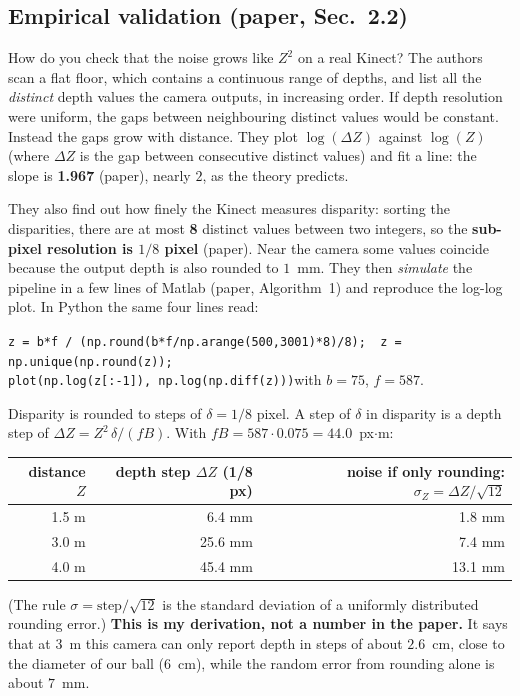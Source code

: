 \documentclass[11pt,a4paper]{article}
\begin{document}
\subsection{Empirical validation (paper, Sec.~2.2)}
\label{sec:quant}
How do you check that the noise grows like $Z^2$ on a real Kinect? The authors scan a flat floor,
which contains a continuous range of depths, and list all the \emph{distinct} depth values the
camera outputs, in increasing order. If depth resolution were uniform, the gaps between neighbouring
distinct values would be constant. Instead the gaps grow with distance. They plot
$\log(\Delta Z)$ against $\log(Z)$ (where $\Delta Z$ is the gap between consecutive distinct values)
and fit a line: the slope is \textbf{1.967} (paper), nearly $2$, as the theory predicts.

They also find out how finely the Kinect measures disparity: sorting the disparities, there are at
most \textbf{8} distinct values between two integers, so the \textbf{sub-pixel resolution is
$1/8$ pixel} (paper). Near the camera some values coincide because the output depth is also rounded
to $1$~mm. They then \emph{simulate} the pipeline in a few lines of Matlab (paper, Algorithm~1)
and reproduce the log-log plot. In Python the same four lines read:
\begin{center}\small\texttt{z = b*f / (np.round(b*f/np.arange(500,3001)*8)/8);\ \ z = np.unique(np.round(z));}\\
\texttt{plot(np.log(z[:-1]), np.log(np.diff(z)))}\quad with $b=75$, $f=587$.\end{center}

\begin{toy}
Disparity is rounded to steps of $\delta=1/8$ pixel. A step of $\delta$ in disparity is a depth step
of $\Delta Z = Z^2\,\delta/(fB)$. With $fB=587\cdot0.075=44.0$~px$\cdot$m:
\begin{center}\small
\begin{tabular}{@{}rrr@{}}
\toprule
distance $Z$ & depth step $\Delta Z$ (1/8 px) & noise if only rounding: $\sigma_Z=\Delta Z/\sqrt{12}$ \\
\midrule
1.5 m & 6.4 mm & 1.8 mm \\
3.0 m & 25.6 mm & 7.4 mm \\
4.0 m & 45.4 mm & 13.1 mm \\
\bottomrule
\end{tabular}
\end{center}
(The rule $\sigma=\text{step}/\sqrt{12}$ is the standard deviation of a uniformly distributed
rounding error.) \textbf{This is my derivation, not a number in the paper.} It says that at $3$~m
this camera can only report depth in steps of about $2.6$~cm, close to the diameter of our ball
($6$~cm), while the random error from rounding alone is about $7$~mm.
\end{toy}
\end{document}
